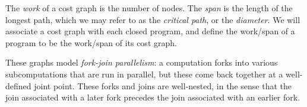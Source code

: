 The \emph{work} of a cost graph is the number of nodes.  The \emph{span}
is the length of the longest path, which we may refer to as the
\emph{critical path}, or the \emph{diameter}.  We will associate a cost
graph with each closed program, and define the work/span of a program to
be the work/span of its cost graph.

These graphs model \emph{fork-join parallelism}: a computation forks
into various subcomputations that are run in parallel, but these come
back together at a well-defined joint point.  These forks and joins are
well-nested, in the sense that the join associated with a later fork
precedes the join associated with an earlier fork.
